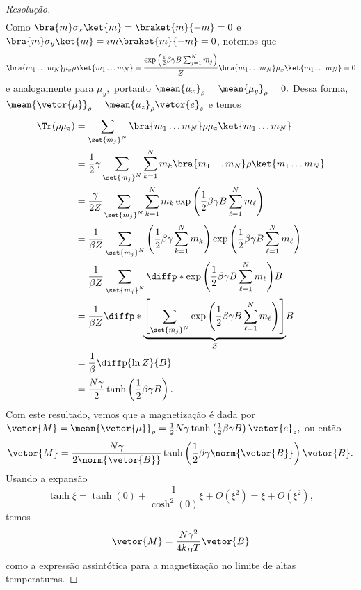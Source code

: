 \begin{proof}[Resolução]
\begin{align*}
   \end{align*}
   Como \(\bra{m} \sigma_x \ket{m} = \braket{m}{-m} = 0\) e \(\bra{m} \sigma_y \ket{m} = im \braket{m}{-m} = 0\), notemos que
   \begin{equation*}
      \bra{m_1\dots m_N} \mu_x \rho \ket{m_1 \dots m_N} = \frac{\exp\left(\frac12 \beta \gamma B \sum_{j = 1}^N m_j\right)}{Z}\bra{m_1\dots m_N} \mu_x \ket{m_1\dots m_N} = 0
   \end{equation*}
   e analogamente para \(\mu_y,\) portanto \(\mean{\mu_x}_\rho = \mean{\mu_y}_{\rho} = 0.\) Dessa forma, \(\mean{\vetor{\mu}}_\rho = \mean{\mu_z}_{\rho} \vetor{e}_z\) e temos
   \begin{align*}
      \Tr(\rho \mu_z) &= \sum_{\set{m_j}^N} \bra{m_1 \dots m_N}\rho \mu_z \ket{m_1 \dots m_N}\\
                      &= \frac12 \gamma \sum_{\set{m_j}^N} \sum_{k = 1}^N m_k \bra{m_1 \dots m_N} \rho \ket{m_1 \dots m_N}\\
                      &= \frac{\gamma}{2Z} \sum_{\set{m_j}^N} \sum_{k = 1}^N m_k \exp\left(\frac12 \beta \gamma B \sum_{\ell = 1}^N m_\ell\right)\\
                      &= \frac{1}{\beta Z} \sum_{\set{m_j}^N} \left(\frac12 \beta \gamma \sum_{k = 1}^N m_k\right)\exp\left(\frac12 \beta \gamma B\sum_{\ell = 1}^N m_{\ell}\right) \\
                      &= \frac{1}{\beta Z} \sum_{\set{m_j}^N} \diffp*{\exp\left(\frac12 \beta \gamma B \sum_{\ell = 1}^N m_{\ell}\right)}{B}\\
                      &= \frac{1}{\beta Z} \diffp*{\underbrace{\left[\sum_{\set{m_j}^N} \exp\left(\frac12 \beta \gamma B \sum_{\ell = 1}^N m_{\ell}\right)\right]}_{Z}}{B}\\
                      &= \frac{1}{\beta} \diffp{\ln Z}{B}\\
                      &= \frac{N \gamma}{2} \tanh\left(\frac12 \beta \gamma B\right).
   \end{align*}
   Com este resultado, vemos que a magnetização é dada por \(\vetor{M} = \mean{\vetor{\mu}}_\rho = \frac12 N \gamma \tanh\left(\frac12 \beta \gamma B\right)\vetor{e}_z,\) ou então
   \begin{equation*}
      \vetor{M} = \frac{N\gamma}{2 \norm{\vetor{B}}} \tanh\left(\frac12 \beta \gamma \norm{\vetor{B}}\right) \vetor{B}.
   \end{equation*}
   Usando a expansão
   \begin{equation*}
      \tanh \xi = \tanh(0) + \frac{1}{\cosh^2(0)} \xi + O(\xi^2) = \xi + O(\xi^2),
   \end{equation*}
   temos
   \begin{equation*}
      \vetor{M} = \frac{N \gamma^2}{4k_B T}\vetor{B}
   \end{equation*}
   como a expressão assintótica para a magnetização no limite de altas temperaturas.
\end{proof}
